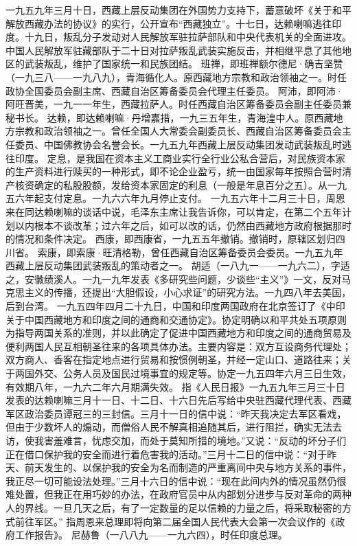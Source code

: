 \begin{maonote}
一九五九年三月十日，西藏上层反动集团在外国势力支持下，蓄意破坏《关于和平解放西藏办法的协议》的实行，公开宣布“西藏独立”。十七日，达赖喇嘛逃往印度。十九日，叛乱分子发动对人民解放军驻拉萨部队和中央代表机关的全面进攻。中国人民解放军驻藏部队于二十日对拉萨叛乱武装实施反击，并相继平息了其他地区的武装叛乱，维护了国家统一和民族团结。
班禅，即班禅额尔德尼·确吉坚赞（一九三八——一九八九），青海循化人。原西藏地方宗教和政治领袖之一。时任政协全国委员会副主席、西藏自治区筹备委员会代理主任委员。
阿沛，即阿沛·阿旺晋美，一九一一年生，西藏拉萨人。时任西藏自治区筹备委员会副主任委员兼秘书长。
达赖，即达赖喇嘛·丹增嘉措，一九三五年生，青海湟中人。原西藏地方宗教和政治领袖之一。曾任全国人大常委会副委员长、西藏自治区筹备委员会主任委员、中国佛教协会名誉会长。一九五九年西藏上层反动集团发动武装叛乱时逃往印度。
定息，是我国在资本主义工商业实行全行业公私合营后，对民族资本家的生产资料进行赎买的一种形式，即不论企业盈亏，统一由国家每年按照合营时清产核资确定的私股股额，发给资本家固定的利息（一般是年息百分之五）。从一九五六年起支付定息。一九六六年九月停止支付。
一九五六年十二月三十日，周恩来在同达赖喇嘛的谈话中说，毛泽东主席让我告诉你，可以肯定，在第二个五年计划以内根本不谈改革；过六年之后，如可以改的话，仍然由西藏地方政府根据那时的情况和条件决定。
西康，即西康省，一九五五年撤销。撤销时，原辖区划归四川省。
索康，即索康·旺清格勒，曾任西藏自治区筹备委员会委员。一九五九年西藏上层反动集团武装叛乱的策动者之一。
胡适（一八九一——一九六二），字适之，安徽绩溪人。一九一九年发表《多研究些问题，少谈些“主义”》一文，反对马克思主义的传播，还提出“大胆假设，小心求证”的研究方法。一九四八年去美国，后到台湾。
一九五四年四月二十九日，中国和印度两国政府在北京签订了《中印关于中国西藏地方和印度之间的通商和交通协定》。协定明确以和平共处五项原则为指导两国关系的准则，并以此确定了促进中国西藏地方和印度之间的通商贸易及便利两国人民互相朝圣往来的各项具体办法。主要内容是：双方互设商务代理处；双方商人、香客在指定地点进行贸易和按惯例朝圣，并经一定山口、道路往来；关于两国外交、公务人员及国民过境事宜的规定等。协定一九五四年六月三日生效，有效期八年，一九六二年六月期满失效。
指《人民日报》一九五九年三月三十日发表的达赖喇嘛三月十一日、十二日、十六日先后写给中央驻西藏代理代表、西藏军区政治委员谭冠三的三封信。三月十一日的信中说：“昨天我决定去军区看戏，但由于少数坏人的煽动，而僧俗人民不解真相追随其后，进行阻拦，确实无法去访，使我害羞难言，忧虑交加，而处于莫知所措的境地。”又说：“反动的坏分子们正在借口保护我的安全而进行着危害我的活动。”三月十二日的信中说：“对于昨天、前天发生的、以保护我的安全为名而制造的严重离间中央与地方关系的事件，我正尽一切可能设法处理。”三月十六日的信中说：“现在此间内外的情况虽然仍很难处置，但我正在用巧妙的办法，在政府官员中从内部划分进步与反对革命的两种人的界线。一旦几天之后，有了一定数量的足以信赖的力量之后，将采取秘密的方式前往军区。”
指周恩来总理即将向第二届全国人民代表大会第一次会议作的《政府工作报告》。
尼赫鲁（一八八九——一九六四），时任印度总理。
\end{maonote}

